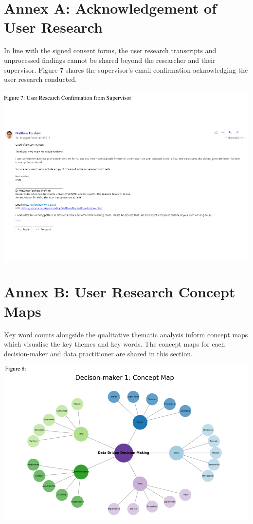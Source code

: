 \documentclass{article}
\begin{document}
\newpage

\hypertarget{annex-a-acknowledgement-of-user-research}{%
\section{Annex A: Acknowledgement of User
Research}\label{annex-a-acknowledgement-of-user-research}}

In line with the signed consent forms, the user research transcripts and
unprocessed findings cannot be shared beyond the researcher and their
supervisor. Figure 7 shares the supervisor's email confirmation
acknowledging the user research conducted.

\includegraphics[width=1\linewidth]{210431461_CSC8639_Dissertation_files/figure-latex/unnamed-chunk-3-1}
\newpage

\hypertarget{annex-b-user-research-concept-maps}{%
\section{Annex B: User Research Concept
Maps}\label{annex-b-user-research-concept-maps}}

\vspace{-0.4cm}

Key word counts alongside the qualitative thematic analysis inform
concept maps which visualise the key themes and key words. The concept
maps for each decision-maker and data practitioner are shared in this
section.

\includegraphics{210431461_CSC8639_Dissertation_files/figure-latex/unnamed-chunk-4-1.pdf}
\end{document}
